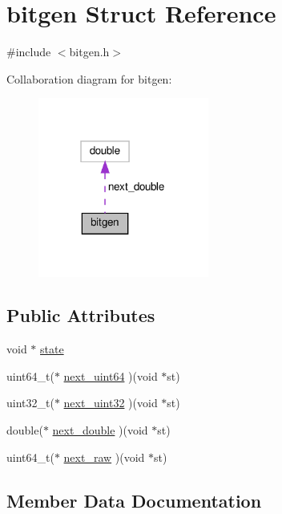\hypertarget{structbitgen}{}\section{bitgen Struct Reference}
\label{structbitgen}


{\ttfamily \#include $<$bitgen.\+h$>$}



Collaboration diagram for bitgen\+:
\nopagebreak
\begin{figure}[H]
\begin{center}
\leavevmode
\includegraphics[width=159pt]{structbitgen__coll__graph}
\end{center}
\end{figure}
\subsection*{Public Attributes}
\begin{DoxyCompactItemize}
\item 
void $\ast$ \hyperlink{structbitgen_ab733f37992eaa4df15d6bbffe866921e}{state}
\item 
uint64\+\_\+t($\ast$ \hyperlink{structbitgen_ac98b5b4679fb88dec14c97d71d15148c}{next\+\_\+uint64} )(void $\ast$st)
\item 
uint32\+\_\+t($\ast$ \hyperlink{structbitgen_af36bd7d57b917544f091262d84d70187}{next\+\_\+uint32} )(void $\ast$st)
\item 
double($\ast$ \hyperlink{structbitgen_a3eb1c225ec9b12db9c318196e98be47a}{next\+\_\+double} )(void $\ast$st)
\item 
uint64\+\_\+t($\ast$ \hyperlink{structbitgen_a914703c2ebdf930e7ec895adfcefe460}{next\+\_\+raw} )(void $\ast$st)
\end{DoxyCompactItemize}


\subsection{Member Data Documentation}
\mbox{\label{structbitgen_a3eb1c225ec9b12db9c318196e98be47a}} 
